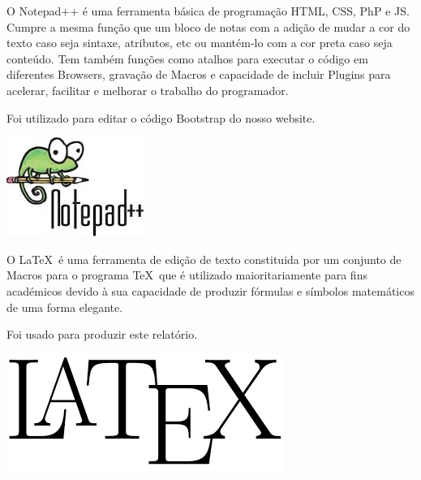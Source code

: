 \documentclass[11pt]{report}
\begin{document}
\centering
\begin{minipage}{.45\linewidth}
	O Notepad++ é uma ferramenta básica de programação HTML, CSS, PhP e JS. Cumpre a mesma função que um bloco de notas com a adição de mudar a cor do texto caso seja sintaxe, atributos, etc ou mantém-lo com a cor preta caso seja conteúdo. Tem também funções como atalhos para executar o código em diferentes Browsers, gravação de Macros e capacidade de incluir Plugins para acelerar, facilitar e melhorar o trabalho do programador.
	
	Foi utilizado para editar o código Bootstrap do nosso website. \\
\end{minipage}
\hspace{.15\linewidth}
\begin{minipage}{.20\linewidth}
  \includegraphics[width=\linewidth]{note.jpg}
  \caption{Logótipo do Notepad++}
  \label{img4}
\end{minipage}

\centering
\begin{minipage}{.45\linewidth}
	O \LaTeX\ é uma ferramenta de edição de texto constituida por um conjunto de Macros para o programa \TeX\, que é utilizado maioritariamente para fins académicos devido à sua capacidade de produzir fórmulas e símbolos matemáticos de uma forma elegante.
	
	Foi usado para produzir este relatório.\\
\end{minipage}
\hspace{.15\linewidth}
\begin{minipage}{.20\linewidth}
  \includegraphics[width=\linewidth]{LaTeX.png}
  \caption{Logótipo do LaTeX}
  \label{img5}
\end{minipage}
\end{document}
